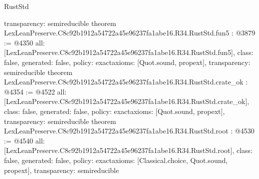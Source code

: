 \begin{lexlean}{RustStd}
\begin{coremodule}
{  transparency: semireducible
}
theorem LexLeanPreserve.C8c92b1912a54722a45e96237fa1abe16.R34.RustStd.fun5 : @3879 := @4350 {
  all: [LexLeanPreserve.C8c92b1912a54722a45e96237fa1abe16.R34.RustStd.fun5],
  class: false,
  generated: false,
  policy: exact{axioms: [Quot.sound, propext]},
  transparency: semireducible
}
theorem LexLeanPreserve.C8c92b1912a54722a45e96237fa1abe16.R34.RustStd.crate_ok : @4354 := @4522 {
  all: [LexLeanPreserve.C8c92b1912a54722a45e96237fa1abe16.R34.RustStd.crate_ok],
  class: false,
  generated: false,
  policy: exact{axioms: [Quot.sound, propext]},
  transparency: semireducible
}
theorem LexLeanPreserve.C8c92b1912a54722a45e96237fa1abe16.R34.RustStd.root : @4530 := @4540 {
  all: [LexLeanPreserve.C8c92b1912a54722a45e96237fa1abe16.R34.RustStd.root],
  class: false,
  generated: false,
  policy: exact{axioms: [Classical.choice, Quot.sound, propext]},
  transparency: semireducible
}


\end{coremodule}
\end{lexlean}
